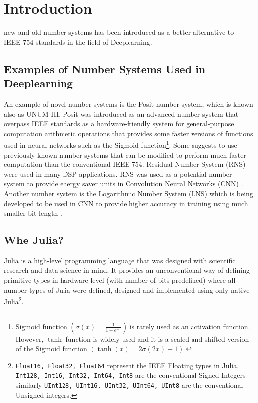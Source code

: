 \section{Introduction}

 new and old number systems has been introduced as a better alternative to IEEE-754 standards\cite{754} in the field of Deeplearning.

\subsection{Examples of Number Systems Used in Deeplearning}

An example of novel number systems is the Posit number system\cite{Gustafson2017}, which is known also as UNUM III. Posit was introduced as an advanced number system that overpass IEEE standards as a hardware-friendly system for general-purpose computation arithmetic operations that provides some faster versions of functions used in neural networks such as the Sigmoid function\footnote{Sigmoid function $\left(\sigma(x) = \frac{1}{1 + e^{-1}}\right)$ is rarely used as an activation function. However, $\tanh$ function is widely used and it is a scaled and shifted version of the Sigmoid function $\left(\tanh(x) = 2 \sigma(2x) -1\right)$.}. Some suggests to use previously known number systems that can be modified to perform much faster computation than the conventional IEEE-754. Residual Number System (RNS) \cite{Garner1959} were used in many DSP applications. RNS was used as a potential number system to provide energy saver units in Convolution Neural Networks (CNN) \cite{Miyashita2016}. Another number system is the Logarithmic Number System (LNS) \cite{Kingsbury1971,Alexopoulos1975,Lee1977} which is being developed to be used in CNN to provide higher accuracy in training using much smaller bit length \cite{Miyashita2016}.

\subsection{Whe Julia?}

Julia \cite{Julia,Bezanson2017} is a high-level programming language that was designed with scientific research and data science in mind. It provides an unconventional way of defining primitive types in hardware level (with number of bits predefined) where all number types of Julia were defined, designed and implemented using only native Julia\footnote{\texttt{Float16, Float32, Float64} represent the IEEE Floating types in Julia. \texttt{Int128, Int16, Int32, Int64, Int8} are the conventional Signed-Integers similarly \texttt{UInt128, UInt16, UInt32, UInt64, UInt8} are the conventional Unsigned integers.}.

